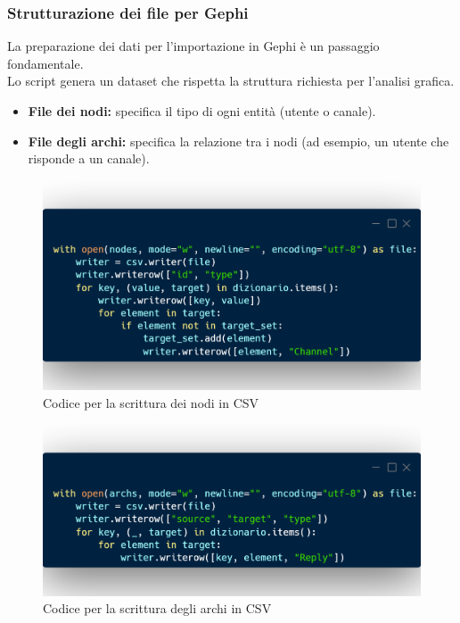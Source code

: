 \documentclass[12pt]{article}
\begin{document}
	\subsubsection{Strutturazione dei file per Gephi}
	La preparazione dei dati per l'importazione in Gephi è un passaggio fondamentale.\\
	Lo script genera un dataset che rispetta la struttura richiesta per l'analisi grafica.
	\begin{itemize}[label=] 
		\item \textbf{File dei nodi:} specifica il tipo di ogni entità (utente o canale).
		\item \textbf{File degli archi:} specifica la relazione tra i nodi (ad esempio, un utente che risponde a un canale).
	\end{itemize}
	\begin{figure}[H]
		\centering
		\includegraphics[width=1.1\textwidth]{immagini/node}
		\caption{Codice per la scrittura dei nodi in CSV}
	\end{figure}
	\begin{figure}[H]
		\centering
		\includegraphics[width=1.1\textwidth]{immagini/archi}
		\caption{Codice per la scrittura degli archi in CSV}
	\end{figure}
\end{document}
